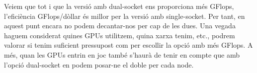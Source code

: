 \begin{table}[h]
\begin{adjustwidth}{-.5in}{-.5in}  
    \begin{center}
    \centering
    \caption{Comparació entre les diferents configuracions dels nodes. \textit{Nota: Els preus de les referències poden no ser exactament iguals que els de la taula, ja que s'han descomptat alguns preus com el de la memòria o disc}}
    \label{tab:web_plaques_cmp}
    \end{center}
    \end{adjustwidth}
\end{table}

Veiem que tot i que la versió amb dual-socket ens proporciona més GFlops, l'eficiència GFlops/dòllar és millor per la versió amb single-socket. Per tant, en aquest punt encara no podem decantar-nos per cap de les dues. Una vegada haguem considerat quines GPUs utilitzem, quina xarxa tenim, etc., podrem valorar si tenim suficient pressupost com per escollir la opció amb més GFlops. A més, quan les GPUs entrin en joc també s'haurà de tenir en compte que amb l'opció dual-socket en podem posar-ne el doble per cada node.

